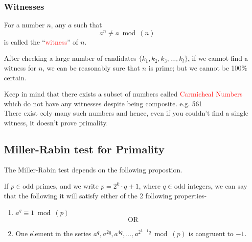 			\subsubsection{Witnesses}\label{subsec:witness}
				\begin{mybox}
					For a number \(n\), any \(a\) such that \[a^n \not \equiv a \bmod(n)\] is called the ``\textcolor{red}{witness}'' of \(n\).
				\end{mybox}	
				After checking a large number of candidates \(\{k_1, k_2, k_3, \ldots, k_l\}\), if we cannot find a witness for \(n\), we can be reasonably sure that \(n\) is prime; but we cannot be 100\% certain.\par
				Keep in mind that there exists a subset of numbers called \textcolor{red}{Carmicheal Numbers} which do not have any witnesses despite being composite. e.g. 561\\
				There exist \(\infty\)ly many such numbers and hence, even if you couldn't find a single witness, it doesn't prove primality.

		\subsection{Miller-Rabin test for Primality}
			The Miller-Rabin test depends on the following propostion.

			\begin{tcolorbox}[title=Proposition, breakable]
				If \(p\in \text{odd primes}\), and we write \(p= 2^k \cdot q + 1\), where \(q\in \text{odd integers}\), we can say that the following it will satisfy either of the 2 following properties-
				\begin{enumerate}
					\item \(a^q\equiv 1 \bmod(p)\) \[\text{OR}\]
					\item One element in the series \(a^q, a^{2q}, a^{4q}, \ldots, a^{2^{k-1}q} \bmod(p)\) is congruent to \(-1\). 
				\end{enumerate}
			\end{tcolorbox}

